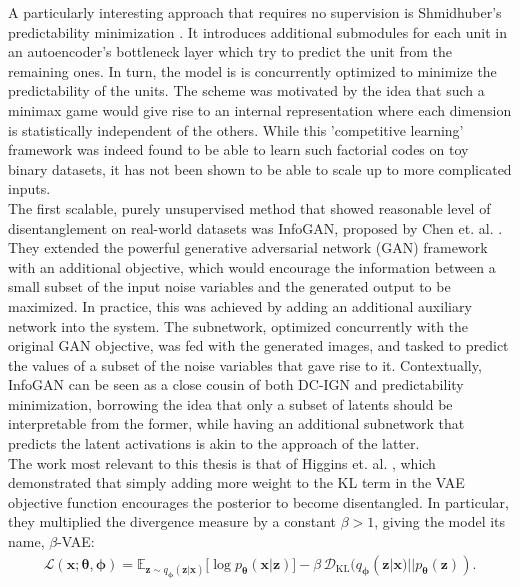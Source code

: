\documentclass{report}
\begin{document}
\noindent A particularly interesting approach that requires no supervision is Shmidhuber's predictability minimization \cite{pred-min-schmidhuber}. It introduces additional submodules for each unit in an autoencoder's bottleneck layer which try to predict the unit from the remaining ones. In turn, the model is is concurrently optimized to minimize the predictability of the units. The scheme was motivated by the idea that such a minimax game would give rise to an internal representation where each dimension is statistically independent of the others. While this 'competitive learning' framework was indeed found to be able to learn such factorial codes on toy binary datasets, it has not been shown to be able to scale up to more complicated inputs. \\

\noindent The first scalable, purely unsupervised method that showed reasonable level of disentanglement on real-world datasets was InfoGAN, proposed by Chen et. al. \cite{infogan}. They extended the powerful generative adversarial network (GAN) framework \cite{gan} with an additional objective, which would encourage the information between a small subset of the input noise variables and the generated output to be maximized. In practice, this was achieved by adding an additional auxiliary network into the system. The subnetwork, optimized concurrently with the original GAN objective, was fed with the generated images, and tasked to predict the values of a subset of the noise variables that gave rise to it. Contextually, InfoGAN can be seen as a close cousin of both DC-IGN and predictability minimization, borrowing the idea that only a subset of latents should be interpretable from the former, while having an additional subnetwork that predicts the latent activations is akin to the approach of the latter. \\

\noindent The work most relevant to this thesis is that of Higgins et. al. \cite{beta-vae}, which demonstrated that simply adding more weight to the KL term in the VAE objective function encourages the posterior to become disentangled. In particular, they multiplied the divergence measure by a constant $\beta > 1$, giving the model its name, $\beta$-VAE:
\begin{equation}
\begin{gathered}
\mathcal{L}(\boldsymbol{x}; \boldsymbol{\theta}, \boldsymbol{\phi}) =
\mathbb{E}_{\boldsymbol{z} \sim q_{\boldsymbol{\phi}}(\boldsymbol{z}|\boldsymbol{x})} \big[ \log p_{\boldsymbol{\theta}} (\boldsymbol{x} | \boldsymbol{z}) \big] - \beta \, \mathcal{D}_\text{KL}(q_{\boldsymbol{\phi}}(\boldsymbol{z}|\boldsymbol{x}) || p_{\boldsymbol{\theta}}(\boldsymbol{z})).
\end{gathered}
\label{eq:beta-vae}
\end{equation}
\end{document}
